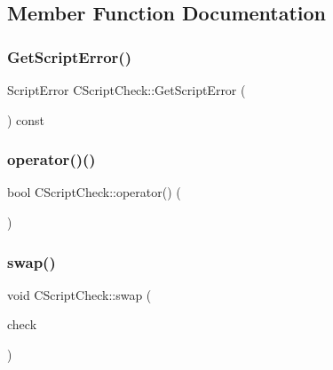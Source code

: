\subsection{Member Function Documentation}
\mbox{\label{class_c_script_check_a1340496c37e521c253606b5957173afd}} 
\subsubsection{\texorpdfstring{Get\+Script\+Error()}{GetScriptError()}}
{\footnotesize\ttfamily Script\+Error C\+Script\+Check\+::\+Get\+Script\+Error (\begin{DoxyParamCaption}{ }\end{DoxyParamCaption}) const\hspace{0.3cm}{\ttfamily [inline]}}

\mbox{\label{class_c_script_check_a108d4c713338308be3867ed4e65b80c5}} 
\subsubsection{\texorpdfstring{operator()()}{operator()()}}
{\footnotesize\ttfamily bool C\+Script\+Check\+::operator() (\begin{DoxyParamCaption}{ }\end{DoxyParamCaption})}

\mbox{\label{class_c_script_check_a69fbde608ff29c1885b8b9caf0fd40a0}} 
\subsubsection{\texorpdfstring{swap()}{swap()}}
{\footnotesize\ttfamily void C\+Script\+Check\+::swap (\begin{DoxyParamCaption}\item[{\mbox{\hyperlink{class_c_script_check}{C\+Script\+Check}} \&}]{check }\end{DoxyParamCaption})\hspace{0.3cm}{\ttfamily [inline]}}




